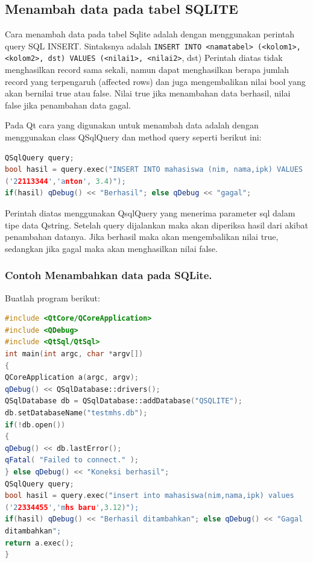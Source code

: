 \subsection{Menambah data pada tabel SQLITE}\label{menambah-data-pada-tabel-sqlite}

Cara menambah data pada tabel Sqlite adalah dengan menggunakan perintah
query SQL INSERT. Sintaksnya adalah
\texttt{INSERT\ INTO\ \textless{}namatabel\textgreater{}\ (\textless{}kolom1\textgreater{},\textless{}kolom2\textgreater{},\ dst)\ VALUES\ (\textless{}nilai1\textgreater{},\ \textless{}nilai2\textgreater{}},
dst) Perintah diatas tidak menghasilkan record sama sekali, namun dapat
menghasilkan berapa jumlah record yang terpengaruh (affected rows) dan
juga mengembalikan nilai bool yang akan bernilai true atau false. Nilai
true jika menambahan data berhasil, nilai false jika penambahan data
gagal.

Pada Qt cara yang digunakan untuk menambah data adalah dengan
menggunakan class QSqlQuery dan method query seperti berikut ini:

\begin{lstlisting}[language=c++, numbers=none]
QSqlQuery query;
bool hasil = query.exec("INSERT INTO mahasiswa (nim, nama,ipk) VALUES
('22113344','anton', 3.4)");
if(hasil) qDebug() << "Berhasil"; else qDebug << "gagal";
\end{lstlisting}

Perintah diatas menggunakan QsqlQuery yang menerima parameter sql dalam
tipe data Qstring. Setelah query dijalankan maka akan diperiksa hasil
dari akibat penambahan datanya. Jika berhasil maka akan mengembalikan
nilai true, sedangkan jika gagal maka akan menghasilkan nilai false.

\subsubsection*{Contoh  Menambahkan data pada SQLite.}

Buatlah program berikut:

\begin{lstlisting}[language=c++, caption= Menambahkan data pada SQLite]
#include <QtCore/QCoreApplication>
#include <QDebug>
#include <QtSql/QtSql>
int main(int argc, char *argv[])
{
QCoreApplication a(argc, argv);
qDebug() << QSqlDatabase::drivers();
QSqlDatabase db = QSqlDatabase::addDatabase("QSQLITE");
db.setDatabaseName("testmhs.db");
if(!db.open())
{
qDebug() << db.lastError();
qFatal( "Failed to connect." );
} else qDebug() << "Koneksi berhasil";
QSqlQuery query;
bool hasil = query.exec("insert into mahasiswa(nim,nama,ipk) values
('22334455','mhs baru',3.12)");
if(hasil) qDebug() << "Berhasil ditambahkan"; else qDebug() << "Gagal
ditambahkan";
return a.exec();
}
\end{lstlisting}

